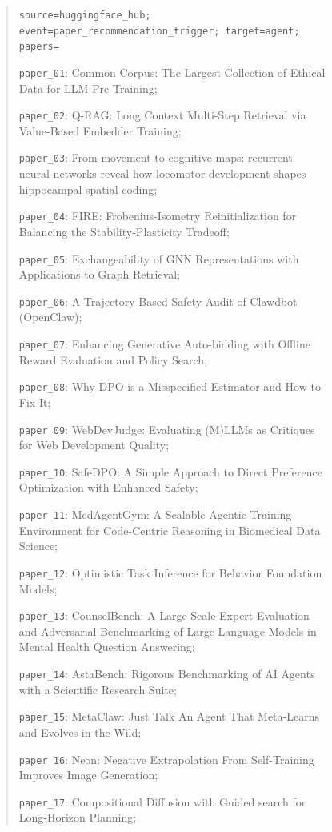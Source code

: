 \documentclass{llmxive}
\begin{document}
\begin{figure}[!htbp]
{\begin{quote}
    
    \texttt{source=huggingface\_hub; event=paper\_recommendation\_trigger; target=agent; papers=}\par
    \texttt{paper\_01}: Common Corpus: The Largest Collection of Ethical Data for LLM Pre-Training;\par
    \texttt{paper\_02}: Q-RAG: Long Context Multi-Step Retrieval via Value-Based Embedder Training;\par
    \texttt{paper\_03}: From movement to cognitive maps: recurrent neural networks reveal how locomotor development shapes hippocampal spatial coding;\par
    \texttt{paper\_04}: FIRE: Frobenius-Isometry Reinitialization for Balancing the Stability-Plasticity Tradeoff;\par
    \texttt{paper\_05}: Exchangeability of GNN Representations with Applications to Graph Retrieval;\par
    \texttt{paper\_06}: A Trajectory-Based Safety Audit of Clawdbot (OpenClaw);\par
    \texttt{paper\_07}: Enhancing Generative Auto-bidding with Offline Reward Evaluation and Policy Search;\par
    \texttt{paper\_08}: Why DPO is a Misspecified Estimator and How to Fix It;\par
    \texttt{paper\_09}: WebDevJudge: Evaluating (M)LLMs as Critiques for Web Development Quality;\par
    \texttt{paper\_10}: SafeDPO: A Simple Approach to Direct Preference Optimization with Enhanced Safety;\par
    \texttt{paper\_11}: MedAgentGym: A Scalable Agentic Training Environment for Code-Centric Reasoning in Biomedical Data Science;\par
    \texttt{paper\_12}: Optimistic Task Inference for Behavior Foundation Models;\par
    \texttt{paper\_13}: CounselBench: A Large-Scale Expert Evaluation and Adversarial Benchmarking of Large Language Models in Mental Health Question Answering;\par
    \texttt{paper\_14}: AstaBench: Rigorous Benchmarking of AI Agents with a Scientific Research Suite;\par
    \texttt{paper\_15}: MetaClaw: Just Talk An Agent That Meta-Learns and Evolves in the Wild;\par
    \texttt{paper\_16}: Neon: Negative Extrapolation From Self-Training Improves Image Generation;\par
    \texttt{paper\_17}: Compositional Diffusion with Guided search for Long-Horizon Planning;\par

\end{quote}}
\end{figure}
\end{document}
